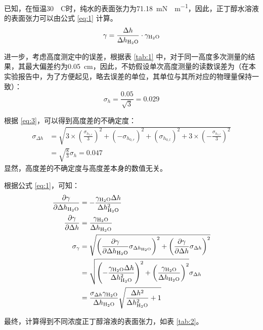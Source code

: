 已知，在恒温\SI{30}{{}^\circ C}时，纯水的表面张力为\SI{71.18}{mN\cdot m^{-1}}\cite{haynes2016crc}，因此，正丁醇水溶液的表面张力可以由公式 \eqref{eq:1} 计算。
\begin{equation}\label{eq:1}
    \gamma =\frac{\Delta h}{\Delta h_{\ce{H2O}}}\cdot \gamma_{\ce{H2O}}
\end{equation}

进一步，考虑高度测定中的误差，根据表 \ref{tab:1} 中，对于同一高度多次测量的结果，其最大偏差约为\SI{0.05}{cm}，因此，不妨假设单次高度测量的读数误差为（在本实验报告中，为了方便起见，略去误差的单位，其单位与其所对应的物理量保持一致）：
\begin{equation*}
    \sigma_h = \frac{0.05}{\sqrt{3}} = 0.029
\end{equation*}

根据 \eqref{eq:3}，可以得到高度差的不确定度：
\begin{align*}
    \sigma_{\Delta h} &= \sqrt{3\times\left(\frac{\sigma_{h_{1,r}}}{3}\right)^2 + \left(-\sigma_{h_{0,r}}\right)^2 + \left(\sigma_{h_{0,l}}\right)^2  + 3\times\left(-\frac{\sigma_{h_{1,l}}}{3}\right)^2}\\
    &= \sqrt{\frac{8}{3}} \sigma_h = 0.047
\end{align*}
显然，高度差的不确定度与高度差本身的数值无关。

根据公式 \eqref{eq:1}，可知：
\begin{align*}
\frac{\partial \gamma }{\partial \Delta h_{\ce{H2O}} }&=- \frac{\gamma_{\ce{H2O}} \Delta h}{\Delta h_{\ce{H2O}}^{2}} \\
\frac{\partial \gamma }{\partial \Delta h }&=\frac{\gamma_{\ce{H2O}}}{\Delta h_{\ce{H2O}}} \\
\sigma_\gamma &=\sqrt{\left(\frac{\partial \gamma }{\partial \Delta h_{\ce{H2O}} } \sigma_{\Delta h_{\ce{H2O}}}\right)^2+\left(\frac{\partial \gamma }{\partial \Delta h } \sigma_{\Delta h}\right)^2}\\
&= \sqrt{\left(- \frac{\gamma_{\ce{H2O}} \Delta h}{\Delta h_{\ce{H2O}}^{2}}\right)^2 + \left(\frac{\gamma_{\ce{H2O}}}{\Delta h_{\ce{H2O}}} \right)^2}\sigma_{\Delta h} \\
&= \frac{\sigma_{\Delta h}\gamma_{\ce{H2O}}}{\Delta h_{\ce{H2O}}}\sqrt{\frac{ \Delta h^2}{\Delta h_{\ce{H2O}}^{2}} + 1}
\end{align*}

最终，计算得到不同浓度正丁醇溶液的表面张力，如表 \ref{tab:2}。

